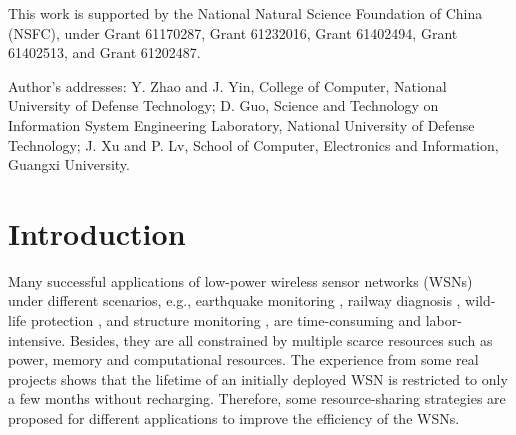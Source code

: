 \documentclass[prodmode,acmtosn]{acmsmall}
\begin{document}




\begin{bottomstuff}
This work is supported by the National Natural Science Foundation of China (NSFC), under Grant 61170287, Grant 61232016, Grant 61402494, Grant 61402513, and Grant 61202487.

Author's addresses: Y. Zhao {and} J. Yin, College of Computer, National University of Defense Technology; D. Guo, Science and Technology on Information System Engineering Laboratory, National University of Defense Technology; J. Xu and P. Lv, School of Computer, Electronics and Information, Guangxi University.
\end{bottomstuff}

\maketitle

\section{Introduction}

\label{introductpion}
Many successful applications of low-power wireless sensor networks (WSNs) under different scenarios, e.g., earthquake monitoring \cite{2005acoustic_diagnose_train}, railway diagnosis \cite{2007sensys_earthquake_monitor}, wild-life protection \cite{2004habitat_monitoring}, and structure monitoring \cite{2004structuralMonitoring}, are time-consuming and labor-intensive. Besides, they are all constrained by multiple scarce resources such as power, memory and computational resources. The experience from some real projects \cite{2009greenorbs,2009_oceansense} shows that the lifetime of an initially deployed WSN is restricted to only a few months without recharging. Therefore, some resource-sharing strategies  are proposed for different applications to improve the efficiency of the WSNs.
\end{document}
